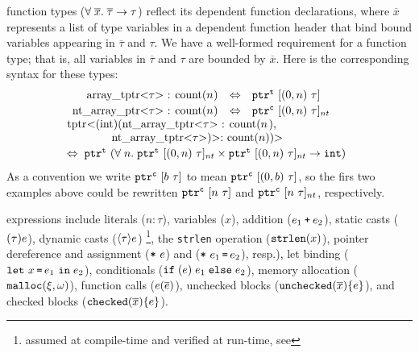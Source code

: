 % 
\lang{} function types ($\forall \;\overline{x}.\;{\overline{\tau}}\to\tau$)
reflect its dependent function declarations,
where $\overline{x}$ represents
a list of \tint{} type variables in a dependent function header
that bind bound variables appearing in $\overline{\tau}$ and $\tau$.
We have a well-formed requirement for a function type;
that is, all variables in $\overline{\tau}$ and $\tau$ are bounded by $\overline{x}$.
Here is the
corresponding \systemname syntax for these types:
\[\hspace*{-0.5em}
\begin{array}{l}
\begin{array}{rcl}
$\code{array_tptr<}$\tau$\code{> : count(}$n$\code{)}$
&\Leftrightarrow& \tarrayptr{0}{n}{\tau}{\tmode}
\\[0.2em]
$\code{nt_array_ptr<}$\tau$\code{> : count(}$n$\code{)}$
&\Leftrightarrow& \tntarrayptr{0}{n}{\tau}{\cmode}
\end{array}
\\[0.2em]
$\code{tptr<(int)(nt_array_tptr<}$\tau$\code{> : count(}$n$\code{),}$\\
\qquad\qquad$\code{nt_array_tptr<}$\tau$\code{>)>: count(}$n$\code{))>}$
\\[0.2em]
\Leftrightarrow\;\; $\tptr{(\tfun{n}{ \tntarrayptr{0}{n}{\tau}{\tmode} \times \tntarrayptr{0}{n}{\tau}{\tmode}}{\tint})}{\tmode}$
\end{array}
\]
As a convention we write $\mathtt{ptr}^{\texttt{c}}~{[{b}~{\tau}]}$ to mean
$\mathtt{ptr}^{\texttt{c}}~{[{({0},{b})}~{\tau}]}$, so the firs two examples above could
be rewritten $\mathtt{ptr}^{\texttt{c}}~{[{n}~{\tau}]}$ and
$\mathtt{ptr}^{\texttt{c}}~{[{n}~{\tau}]_{nt}}$, respectively.

\lang expressions include literals ($n\!:\!\tau$), variables ($x$),
 addition ($e_1 \mathbin{\texttt{+}} e_2$), static casts ($\mathtt{(}{\tau}\mathtt{)}{e}$), 
dynamic casts ($\langle{\tau}\rangle{e}$) \footnote{assumed at compile-time and verified at run-time, see },
the \texttt{strlen} operation ($\mathtt{strlen}({x})$),
pointer dereference and assignment ($\texttt{*}~{e}$)
and ($\texttt{*}~{e_1}\,\texttt{=}\, {e_2}$), resp.),
let binding ($\mathtt{let}~x\, \texttt{=}\, e_1~\mathtt{in}\;{e_2}$),
conditionals ($\mathtt{if\;}(e)\;{e_1}\;\mathtt{else}\;{e_2}$),
memory allocation ($\mathtt{malloc}({\xi},{\omega})$), 
function calls (${e}({\overline{e}})$),
unchecked blocks ($\mathtt{unchecked}({\overline{x}})\{e\}$), and checked blocks ($\mathtt{checked}({\overline{x}}){\{e\}}$).

